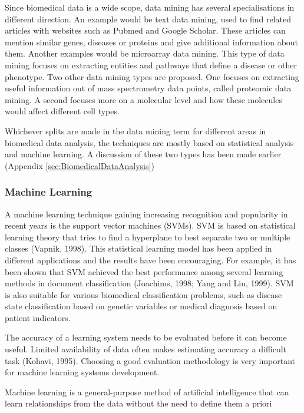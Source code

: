 \documentclass[10pt,a4paper]{article}
\begin{document}
	Since biomedical data is a wide scope, data mining has several specialisations in different direction. An example would be text data mining, used to find related articles with websites such as Pubmed and Google Scholar. These articles can mention similar genes, diseases or proteins and give additional information about them. Another examples would be microarray data mining. This type of data mining focuses on extracting entities and pathways that define a disease or other phenotype. Two other data mining types are proposed. One focuses on extracting useful information out of mass spectrometry data points, called proteomic data mining. A second focuses more on a molecular level and how these molecules would affect different cell types.\cite{YANG2012S16}
	
	Whichever splits are made in the data mining term for different areas in biomedical data analysis, the techniques are mostly based on statistical analysis and machine learning. A discussion of these two types has been made earlier (Appendix \ref{sec:BiomedicalDataAnalysis})
	
	\subsubsection{Machine Learning}
	
	A machine learning technique gaining increasing recognition and
	popularity in recent years is the support vector machines (SVMs). SVM is
	based on statistical learning theory that tries to find a hyperplane to best
	separate two or multiple classes (Vapnik, 1998). This statistical learning
	model has been applied in different applications and the results have been
	encouraging. For example, it has been shown that SVM achieved the best
	performance among several learning methods in document classification
	(Joachims, 1998; Yang and Liu, 1999). SVM is also suitable for various
	biomedical classification problems, such as disease state classification based
	on genetic variables or medical diagnosis based on patient indicators. \cite{chen2006medical}
	
	The accuracy of a learning system needs to be evaluated before it can
	become useful. Limited availability of data often makes estimating accuracy
	a difficult task (Kohavi, 1995). Choosing a good evaluation methodology is
	very important for machine learning systems development. \cite{chen2006medical}
	
	Machine learning is a general-purpose method of artificial intelligence that can learn relationships from the data without the need to define them a priori \cite{doi:10.1093/bib/bbx044}
	
\end{document}
